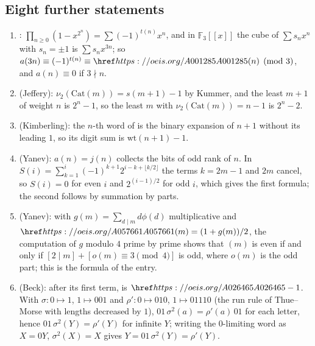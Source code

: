 \subsection{Eight further statements}\label{s:batch8}
\begin{enumerate}
\item {}: $\prod_{n\ge0}(1-x^{2^n})=\sum(-1)^{t(n)}x^n$, and in $\mathbb{F}_3[[x]]$ the cube of $\sum s_nx^n$
  with $s_n=\pm1$ is $\sum s_nx^{3n}$; so $a(3n)\equiv(-1)^{t(n)}\equiv\oeis{A001285}(n)\pmod3$, and $a(n)\equiv0$ if
  $3\nmid n$.
\item {} (Jeffery): $\nu_2(\mathrm{Cat}(m))=s(m+1)-1$ by Kummer, and the least $m+1$ of weight $n$ is
  $2^n-1$, so the least $m$ with $\nu_2(\mathrm{Cat}(m))=n-1$ is $2^n-2$.
\item {} (Kimberling): the $n$-th word of  is the binary expansion of $n+1$ without its
  leading $1$, so its digit sum is $\mathrm{wt}(n+1)-1$.
\item {} (Yanev): $a(n)=j(n)$ collects the bits of odd rank of $n$. In
  $S(i)=\sum_{k=1}^i(-1)^{k+1}2^{i-k+\lfloor k/2\rfloor}$ the terms $k=2m-1$ and $2m$ cancel, so $S(i)=0$ for even $i$ and
  $2^{(i-1)/2}$ for odd $i$, which gives the first formula; the second follows by summation by parts.
\item {} (Yanev): with $g(m)=\sum_{d\mid m}d\phi(d)$ multiplicative and $\oeis{A057661}(m)=(1+g(m))/2$, the
  computation of $g$ modulo $4$ prime by prime shows that $(m)$ is even if and only if
  $[2\mid m]+[o(m)\equiv3\pmod4]$ is odd, where $o(m)$ is the odd part; this is the formula of the entry.
\item {} (Beck): after its first term,  is $\oeis{A026465}-1$. With $\sigma:0\mapsto1$,
  $1\mapsto001$ and $\rho':0\mapsto010$, $1\mapsto01110$ (the run rule of Thue--Morse with lengths decreased by $1$),
  $01\,\sigma^2(a)=\rho'(a)\,01$ for each letter, hence $01\,\sigma^2(Y)=\rho'(Y)$ for infinite $Y$; writing the
  $0$-limiting word as $X=0Y$, $\sigma^2(X)=X$ gives $Y=01\,\sigma^2(Y)=\rho'(Y)$.
\end{enumerate}

